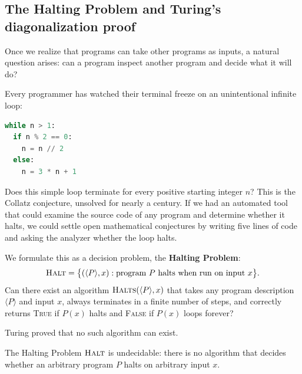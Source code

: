 \subsection{The Halting Problem and Turing's diagonalization proof}

Once we realize that programs can take other programs as inputs, a natural question arises: can a program inspect another program and decide what it will do?

Every programmer has watched their terminal freeze on an unintentional infinite loop:
\begin{lstlisting}[language=Python]
while n > 1:
  if n % 2 == 0:
    n = n // 2
  else:
    n = 3 * n + 1
\end{lstlisting}
Does this simple loop terminate for every positive starting integer $n$? This is the Collatz conjecture, unsolved for nearly a century. If we had an automated tool that could examine the source code of any program and determine whether it halts, we could settle open mathematical conjectures by writing five lines of code and asking the analyzer whether the loop halts.

We formulate this as a decision problem, the \textbf{Halting Problem}:
\[
  \textsc{Halt} = \big\{ (\langle P \rangle, x) : \text{program } P \text{ halts when run on input } x \big\}.
\]
Can there exist an algorithm $\textsc{Halts}(\langle P \rangle, x)$ that takes any program description $\langle P \rangle$ and input $x$, always terminates in a finite number of steps, and correctly returns \textsc{True} if $P(x)$ halts and \textsc{False} if $P(x)$ loops forever?

Turing proved that no such algorithm can exist.

\begin{theorem}
\label{ch33:thm-halting}
The Halting Problem $\textsc{Halt}$ is undecidable: there is no algorithm that decides whether an arbitrary program $P$ halts on arbitrary input $x$.
\end{theorem}

